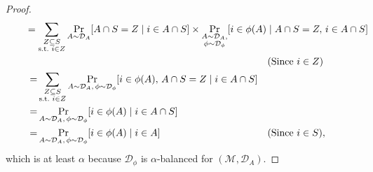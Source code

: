 \documentclass[11pt]{article}
\newcommand{\D}{\mathcal D}
\newcommand{\M}{{\mathcal M}}
\begin{document}
\begin{proof}[Proof]
\begin{align*}
    \mathclap{\qquad\qquad\qquad\qquad\qquad\qquad\qquad\qquad\qquad\qquad\qquad\qquad\qquad\qquad\qquad\qquad\,\,\,\,\,=\sum_{\substack{Z\subseteq S\\ \textrm{s.t.~}i\in Z}}\Pr_{A\sim \D_A}[A\cap S=Z\mid i\in A\cap S]\times\Pr_{\substack{A\sim\D_{A},\\\phi\sim \D_{\phi}}}[i\in \phi(A)\mid A\cap S=Z,\,i\in A\cap S]} \\
    &&&\text{(Since $i\in Z$)}\\
    =&\sum_{\substack{Z\subseteq S\\ \textrm{s.t.~}i\in Z}}\Pr_{A\sim \D_A,\,\phi\sim \D_{\phi}}[i\in\phi(A),\,A\cap S=Z\mid i\in A\cap S]\\
    =&\Pr_{A\sim\D_A,\,\phi\sim \D_{\phi}}[i\in \phi(A) \mid i\in A\cap S]\\
    =&\Pr_{A\sim\D_A,\,\phi\sim \D_{\phi}}[i\in \phi(A) \mid i\in A] &&\text{(Since $i\in S$)},
\end{align*}
which is at least $\alpha$ because $\D_{\phi}$ is $\alpha$-balanced for $(\M,\D_A)$.
\end{proof}
\end{document}
